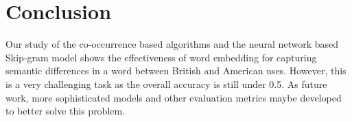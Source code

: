 \section{Conclusion}
Our study of the co-occurrence based algorithms and the neural network based
Skip-gram model shows the effectiveness of word embedding for capturing
semantic differences in a word between British and American uses.
However, this is a very challenging task as the overall accuracy 
is still under 0.5. As future work,
more sophisticated models and other evaluation metrics maybe developed
to better solve this problem.
